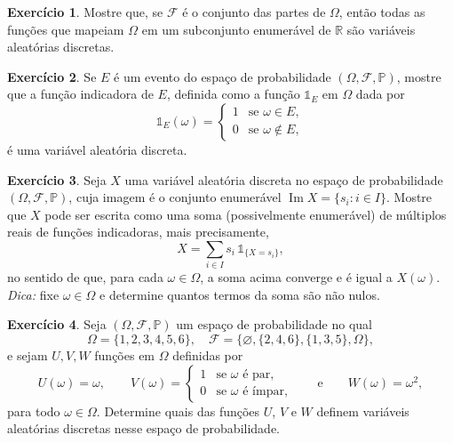 \documentclass[12pt,portuguese]{article}
\theoremstyle{definition}
\newtheorem{exercise}{Exercício}
\begin{document}
\begin{exercise}\label{exercise:power-set-todas-funcoes}
  Mostre que, se \(\mathcal{F}\) é o conjunto das partes de \(\Omega\),
  então todas as funções que mapeiam \(\Omega\) em um subconjunto enumerável
  de \(\mathbb{R}\) são variáveis aleatórias discretas.
\end{exercise}

\begin{exercise}\label{exercise:indicadora-e-va}
  Se \(E\) é um evento do espaço de probabilidade \((\Omega, \mathcal{F},
  \mathbb{P})\), mostre que a função indicadora de \(E\), definida como a
  função \(\mathds{1}_E\) em \(\Omega\) dada por
  \[
    \mathds{1}_E(\omega) = \begin{cases} 1 & \text{se } \omega \in E, \\ 0 &
      \text{se } \omega \notin E, \end{cases}
  \]
  é uma variável aleatória discreta.
\end{exercise}



\begin{exercise}\label{exercise:va-como-soma-de-indicadoras}
  Seja \(X\) uma variável aleatória discreta no espaço de probabilidade
  \((\Omega, \mathcal{F}, \mathbb{P})\), cuja imagem é o conjunto enumerável
  \(\operatorname{Im} X = \{s_i : i \in I\}\). Mostre que \(X\) pode ser escrita
  como uma soma (possivelmente enumerável) de múltiplos reais de funções
  indicadoras, mais precisamente,
  \[
    X = \sum_{i \in I} s_i \, \mathds{1}_{\{X = s_i\}},
  \]
  no sentido de que, para cada \(\omega \in \Omega\), a soma acima converge e é
  igual a \(X(\omega)\). \emph{Dica:} fixe \(\omega \in \Omega\) e determine
  quantos termos da soma são não nulos.
\end{exercise}

\begin{exercise}\label{exercise:va-em-dado-com-sigma-algebra}
  Seja \((\Omega, \mathcal{F}, \mathbb{P})\) um espaço de probabilidade no
  qual
  \[
    \Omega = \{1, 2, 3, 4, 5, 6\}, \quad \mathcal{F} = \{\varnothing, \{2,
    4, 6\}, \{1, 3, 5\}, \Omega\},
  \]
  e sejam \(U, V, W\) funções em \(\Omega\) definidas por
  \[
    U(\omega) = \omega, \qquad V(\omega) = \begin{cases} 1 & \text{se }
      \omega \text{ é par,} \\ 0 & \text{se } \omega \text{ é ímpar,}
      \end{cases}
      \qquad \text{e}\qquad  W(\omega) = \omega^2,
  \]
  para todo \(\omega \in \Omega\). Determine quais das funções \(U\), \(V\) e \(W\)
  definem variáveis aleatórias discretas nesse espaço de probabilidade.
\end{exercise}
\end{document}
